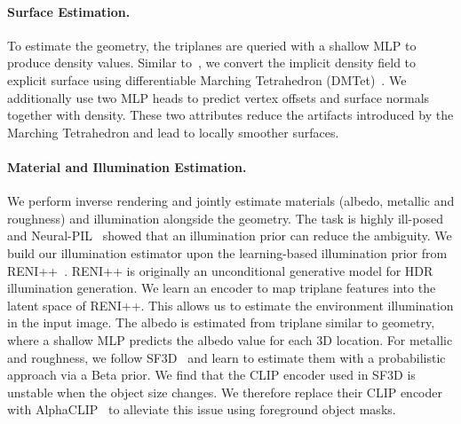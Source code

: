 \paragraph{Surface Estimation.}
To estimate the geometry, the triplanes are queried with a shallow MLP to produce density values. Similar to~\cite{sf3d2024,wang2024crm,xu2024instantmesh}, we convert the implicit density field to explicit surface using differentiable Marching Tetrahedron (DMTet)~\cite{shen2021deep}. We additionally use two MLP heads to predict vertex offsets and surface normals together with density. These two attributes reduce the artifacts introduced by the Marching Tetrahedron and lead to locally smoother surfaces.

\paragraph{Material and Illumination Estimation.}
We perform inverse rendering and jointly estimate materials (albedo, metallic and roughness) and illumination alongside the geometry. The task is highly ill-posed and Neural-PIL~\cite{Boss2021neuralPIL} showed that an illumination prior can reduce the ambiguity. We build our illumination estimator upon the learning-based illumination prior from RENI++~\cite{gardner2023reni++}. RENI++ is originally an unconditional generative model for HDR illumination generation. We learn an encoder to map triplane features into the latent space of RENI++. This allows us to estimate the environment illumination in the input image. The albedo is estimated from triplane similar to geometry, where a shallow MLP predicts the albedo value for each 3D location. For metallic and roughness, we follow SF3D~\cite{sf3d2024} and learn to estimate them with a probabilistic approach via a Beta prior. We find that the CLIP encoder used in SF3D is unstable when the object size changes. We therefore replace their CLIP encoder with AlphaCLIP~\cite{sun2023alphaclip} to alleviate this issue using foreground object masks.

